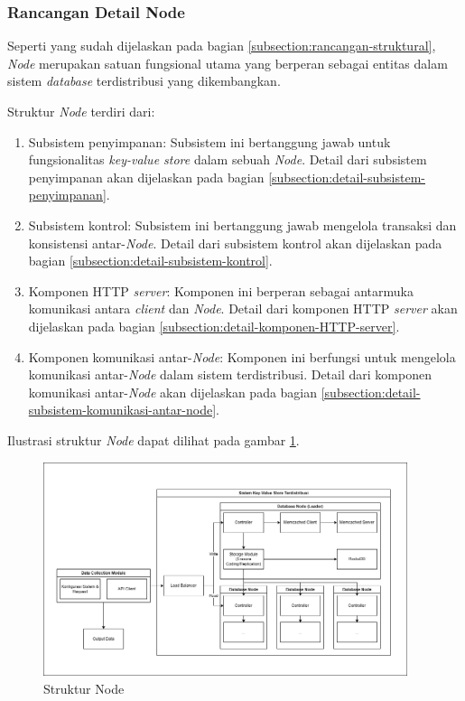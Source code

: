 \subsubsection{Rancangan Detail Node}
\label{subsubsection:detail-node}

Seperti yang sudah dijelaskan pada bagian \ref{subsection:rancangan-struktural}, \textit{Node} merupakan satuan fungsional utama yang berperan sebagai entitas dalam sistem \textit{database} terdistribusi yang dikembangkan.

Struktur \textit{Node} terdiri dari:

\begin{enumerate}
    \item Subsistem penyimpanan: Subsistem ini bertanggung jawab untuk fungsionalitas \textit{key-value store} dalam sebuah \textit{Node}. Detail dari subsistem penyimpanan akan dijelaskan pada bagian \ref{subsection:detail-subsistem-penyimpanan}.
    \item Subsistem kontrol: Subsistem ini bertanggung jawab mengelola transaksi dan konsistensi antar-\textit{Node}. Detail dari subsistem kontrol akan dijelaskan pada bagian \ref{subsection:detail-subsistem-kontrol}.
    \item Komponen HTTP \textit{server}: Komponen ini berperan sebagai antarmuka komunikasi antara \textit{client} dan \textit{Node}. Detail dari komponen HTTP \textit{server} akan dijelaskan pada bagian \ref{subsection:detail-komponen-HTTP-server}.
    \item Komponen komunikasi antar-\textit{Node}: Komponen ini berfungsi untuk mengelola komunikasi antar-\textit{Node} dalam sistem terdistribusi. Detail dari komponen komunikasi antar-\textit{Node} akan dijelaskan pada bagian \ref{subsection:detail-subsistem-komunikasi-antar-node}.
\end{enumerate}

Ilustrasi struktur \textit{Node} dapat dilihat pada gambar \ref{fig:node-structure}.

\begin{figure}[ht]
    \centering
    \includegraphics[width=0.95\textwidth]{resources/chapter-3/general-architecture.png}
    \caption{Struktur Node}
    \label{fig:node-structure}
\end{figure}